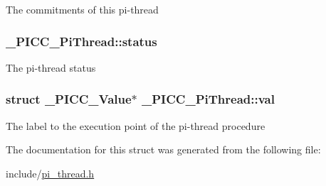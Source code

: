 The commitments of this pi-\/thread \hypertarget{struct__PICC__PiThread_a08e8708363d2deb97335407398229118}{
\subsubsection[{status}]{ \-\_\-\-P\-I\-C\-C\-\_\-\-Pi\-Thread\-::status}}\label{struct__PICC__PiThread_a08e8708363d2deb97335407398229118}
The pi-\/thread status \hypertarget{struct__PICC__PiThread_a4ea626adcda4fe73b9b2fdf12b824c83}{
\subsubsection[{val}]{\setlength{\rightskip}{0pt plus 5cm}struct {\bf \-\_\-\-P\-I\-C\-C\-\_\-\-Value}$\ast$ \-\_\-\-P\-I\-C\-C\-\_\-\-Pi\-Thread\-::val}}\label{struct__PICC__PiThread_a4ea626adcda4fe73b9b2fdf12b824c83}
The label to the execution point of the pi-\/thread procedure 

The documentation for this struct was generated from the following file\-:\begin{DoxyCompactItemize}
\item 
include/\hyperlink{pi__thread_8h}{pi\-\_\-thread.\-h}\end{DoxyCompactItemize}
